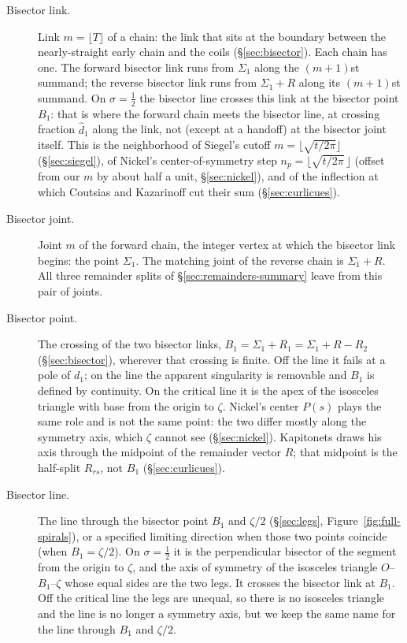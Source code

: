 \documentclass[11pt]{article}
\theoremstyle{definition}
\begin{document}
\begin{description}
\item[Bisector link.]
Link $m=\lfloor T\rfloor$ of a chain: the link that sits at the
boundary between the nearly-straight early chain and the coils
(\S\ref{sec:bisector}).
Each chain has one.
The forward bisector link runs from $\Sigma_1$ along the
$(m+1)$st summand; the reverse bisector link runs from $\Sigma_1+R$
along its $(m+1)$st summand.
On $\sigma=\tfrac12$ the bisector line crosses this link at the
bisector point $B_1$: that is where the forward chain meets the
bisector line, at crossing fraction $\hat d_1$ along the link, not
(except at a handoff) at the bisector joint itself.
This is the neighborhood of Siegel's cutoff
$m=\lfloor\sqrt{t/2\pi}\rfloor$ (\S\ref{sec:siegel}), of Nickel's
center-of-symmetry step $n_p=\bigl\lfloor\sqrt{t/2\pi}\,\bigr\rfloor$ (offset from our $m$
by about half a unit, \S\ref{sec:nickel}), and of the inflection at
which Coutsias and Kazarinoff cut their sum
(\S\ref{sec:curlicues}).

\item[Bisector joint.]
Joint $m$ of the forward chain, the integer vertex at which the
bisector link begins: the point $\Sigma_1$.
The matching joint of the reverse chain is $\Sigma_1+R$.
All three remainder splits of \S\ref{sec:remainders-summary} leave
from this pair of joints.

\item[Bisector point.]
The crossing of the two bisector links,
$B_1=\Sigma_1+R_{1}=\Sigma_1+R-R_{2}$
(\S\ref{sec:bisector}), wherever that crossing is finite.
Off the line it fails at a pole of $d_1$; on the line the
apparent singularity is removable and $B_1$ is defined by
continuity.
On the critical line it is the apex of the isosceles triangle with
base from the origin to $\zeta$.
Nickel's center $P(s)$ plays the same role and is not the same
point: the two differ mostly along the symmetry axis, which $\zeta$
cannot see (\S\ref{sec:nickel}).
Kapitonets draws his axis through the midpoint of the remainder
vector $R$; that midpoint is the half-split $R_{rs}$, not $B_1$
(\S\ref{sec:curlicues}).

\item[Bisector line.]
The line through the bisector point $B_1$ and $\zeta/2$
(\S\ref{sec:legs}, Figure~\ref{fig:full-spirals}),
or a specified limiting direction when those two points coincide
(when $B_1=\zeta/2$).
On $\sigma=\tfrac12$ it is the perpendicular bisector of the
segment from the origin to $\zeta$, and the axis of symmetry of
the isosceles triangle $O$--$B_1$--$\zeta$ whose equal sides are
the two legs. It crosses the bisector link at $B_1$. Off the
critical line the legs are unequal, so there is no isosceles
triangle and the line is no longer a symmetry axis, but we keep
the same name for the line through $B_1$ and $\zeta/2$.


\end{description}
\end{document}
